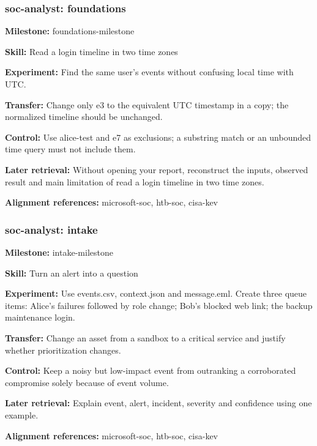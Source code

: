 \subsubsection{soc-analyst: foundations}
\noindent\textbf{Milestone:} foundations-milestone\par
\noindent\textbf{Skill:} Read a login timeline in two time zones\par
\noindent\textbf{Experiment:} Find the same user’s events without confusing local time with UTC.\par
\noindent\textbf{Transfer:} Change only e3 to the equivalent UTC timestamp in a copy; the normalized timeline should be unchanged.\par
\noindent\textbf{Control:} Use alice-test and e7 as exclusions; a substring match or an unbounded time query must not include them.\par
\noindent\textbf{Later retrieval:} Without opening your report, reconstruct the inputs, observed result and main limitation of read a login timeline in two time zones.\par
\noindent\textbf{Alignment references:} microsoft-soc, htb-soc, cisa-kev\par
\subsubsection{soc-analyst: intake}
\noindent\textbf{Milestone:} intake-milestone\par
\noindent\textbf{Skill:} Turn an alert into a question\par
\noindent\textbf{Experiment:} Use events.csv, context.json and message.eml. Create three queue items: Alice’s failures followed by role change; Bob’s blocked web link; the backup maintenance login.\par
\noindent\textbf{Transfer:} Change an asset from a sandbox to a critical service and justify whether prioritization changes.\par
\noindent\textbf{Control:} Keep a noisy but low-impact event from outranking a corroborated compromise solely because of event volume.\par
\noindent\textbf{Later retrieval:} Explain event, alert, incident, severity and confidence using one example.\par
\noindent\textbf{Alignment references:} microsoft-soc, htb-soc, cisa-kev\par
